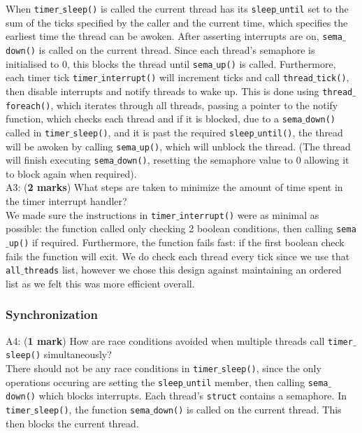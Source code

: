 \documentclass[a4paper,12pt]{article}
\begin{document}
When \texttt{timer$\_$sleep()} is called the current thread has its \texttt{sleep$\_$until} set to the sum of the ticks specified by the caller and the current time, which specifies the earliest time the thread can be awoken. After asserting interrupts are on, \texttt{sema$\_$down()} is called on the current thread. Since each thread's semaphore is initialised to 0, this blocks the thread until \texttt{sema$\_$up()} is called. Furthermore, each timer tick \texttt{timer$\_$interrupt()} will increment ticks and call \texttt{thread$\_$tick()}, then disable interrupts and notify threads to wake up. This is done using \texttt{thread$\_$foreach()}, which iterates through all threads, passing a pointer to the notify function, which checks each thread and if it is blocked, due to a \texttt{sema$\_$down()} called in \texttt{timer$\_$sleep()}, and it is past the required \texttt{sleep$\_$until()}, the thread will be awoken by calling \texttt{sema$\_$up()}, which will unblock the thread. (The thread will finish executing \texttt{sema$\_$down()}, resetting the semaphore value to 0 allowing it to block again when required). \\

A3: ({\bf 2 marks}) What steps are taken to minimize the amount of time spent in the timer interrupt handler? \\

We made sure the instructions in \texttt{timer$\_$interrupt()} were as minimal as possible: the function called only checking 2 boolean conditions, then calling \texttt{sema$\_$up()} if required. Furthermore, the function fails fast: if the first boolean check fails the function will exit. We do check each thread every tick since we use that \texttt{all$\_$threads} list, however we chose this design against maintaining an ordered list as we felt this was more efficient overall. \\

\subsubsection*{Synchronization}
A4: ({\bf 1 mark}) How are race conditions avoided when multiple threads call \texttt{timer$\_$sleep()} simultaneously? \\

There should not be any race conditions in \texttt{timer$\_$sleep()}, since the only operations occuring are setting the \texttt{sleep$\_$until} member, then calling \texttt{sema$\_$down()} which blocks interrupts. Each thread's \texttt{struct} contains a semaphore. In \texttt{timer$\_$sleep()}, the function \texttt{sema$\_$down()} is called on the current thread. This then blocks the current thread.
\end{document}

